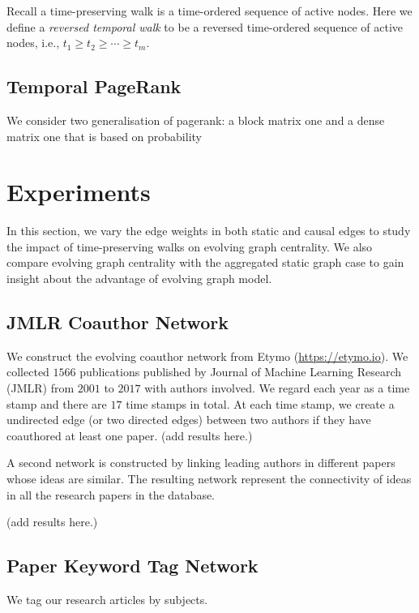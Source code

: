 \documentclass[12pt]{article}
\theoremstyle{definition}
\begin{document}
Recall a time-preserving walk is a time-ordered sequence of active nodes. Here we define a \emph{reversed temporal walk} to be a reversed time-ordered sequence of active nodes, i.e.,
$t_1 \ge t_2 \ge \cdots \ge t_m$.

\subsection{Temporal PageRank}

We consider two generalisation of pagerank: a block matrix one and a dense matrix one that is based on probability


\section{Experiments}
\label{sec:experiments}

In this section, we vary the edge
weights in both static and causal edges to study the impact of time-preserving walks on evolving graph centrality.
We also compare evolving graph centrality with the aggregated static graph case to gain insight about the advantage of evolving graph model.

\subsection{JMLR Coauthor Network}
\label{sec:jmlr-coauth-netw}


We construct the evolving coauthor network from Etymo (\url{https://etymo.io}).
We collected $1566$ publications published by Journal of Machine Learning Research (JMLR) from $2001$ to $2017$ with authors involved. We regard each year
as a time stamp and there are $17$ time stamps in total. At each time stamp, we
create a undirected edge (or two directed edges) between two authors if they have coauthored at least one paper.
(add results here.)

A second network is constructed by linking leading authors in different papers whose
ideas are similar. The resulting network represent the connectivity of ideas in all the research papers in the database.

(add results here.)

\subsection{Paper Keyword Tag Network}

We tag our research articles by subjects.
\end{document}
